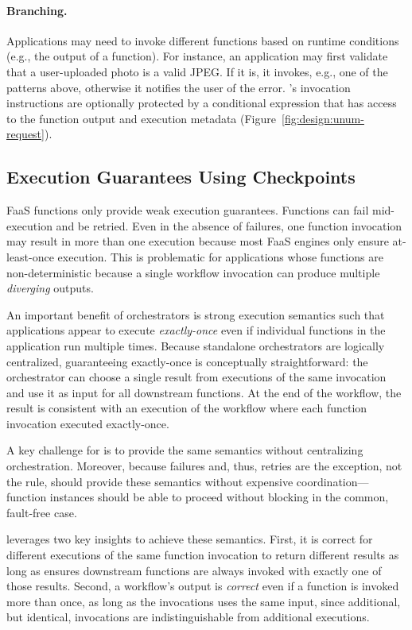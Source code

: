 \paragraph{Branching.}
Applications may need to invoke different functions based on runtime conditions
(e.g., the output of a function). For instance, an application may first
validate that a user-uploaded photo is a valid JPEG. If it is, it invokes, e.g.,
one of the patterns above, otherwise it notifies the user of the error.
\name{}'s invocation instructions are optionally protected by a conditional
expression that has access to the function output and execution metadata
(Figure~\ref{fig:design:unum-request}).



\subsection{Execution Guarantees Using Checkpoints}\label{sec:design:execution}

FaaS functions only provide weak execution guarantees. Functions can fail
mid-execution and be retried. Even in the absence of failures, one function
invocation may result in more than one execution because most FaaS engines
only ensure at-least-once execution. This is problematic for applications
whose functions are non-deterministic because a single workflow invocation can
produce multiple \emph{diverging} outputs.

An important benefit of orchestrators is strong execution semantics such that
applications appear to execute \emph{exactly-once} even if individual
functions in the application run multiple times. Because standalone
orchestrators are logically centralized, guaranteeing exactly-once is
conceptually straightforward: the orchestrator can choose a single result from
executions of the same invocation and use it as input for all downstream
functions. At the end of the workflow, the result is consistent with an
execution of the workflow where each function invocation executed
exactly-once.

A key challenge for \name{} is to provide the same semantics without
centralizing orchestration. Moreover, because failures and, thus, retries are
the exception, not the rule, \name{} should provide these semantics without
expensive coordination---function instances should be able to proceed without
blocking in the common, fault-free case.

\name{} leverages two key insights to achieve these semantics.  First, it is
 correct for different executions of the same function invocation to return
 different results as long as \name{} ensures downstream functions are always
 invoked with exactly one of those results. Second, a workflow's output is
\emph{correct} even if a function is invoked more than once, as long as the
invocations uses the same input, since additional, but identical, invocations
are indistinguishable from additional executions.

